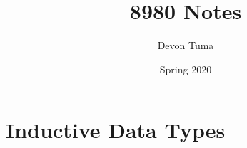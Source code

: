 \documentclass[11pt]{article}
\title{8980 Notes}
\author{Devon Tuma}
\date{Spring 2020}
\begin{document}
\maketitle

\section*{Inductive Data Types}
\end{document}
